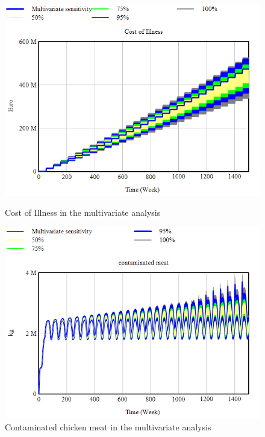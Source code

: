 \begin{figure}[h!]
    \centering
    \begin{minipage}{0.45\textwidth}
        \centering
        \includegraphics[width=1\textwidth]{images/sensitivity/Multivariate COI.png} %
        \caption{Cost of Illness in the multivariate analysis}
        \label{fig:multi_coi}
    \end{minipage}\hfill
    \begin{minipage}{0.45\textwidth}
        \centering
        \includegraphics[width=1\textwidth]{images/sensitivity/Multivariate contaminated meat.png} %
        \caption{Contaminated chicken meat in the multivariate analysis}
        \label{fig:multi_meat}
    \end{minipage}
\end{figure}

